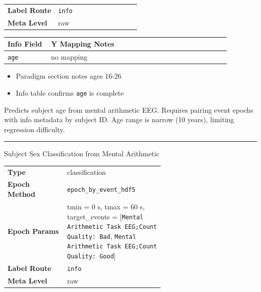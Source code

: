{\begin{tcolorbox}
{\begin{tabular}{@{}lp{0.62\linewidth}@{}}
\textbf{Label Route} & \texttt{info} \\
\textbf{Meta Level} & raw \\
\end{tabular}}
\par{}\par\smallskip
\begingroup\footnotesize
\begin{tabular}{@{}p{0.1760\linewidth}p{0.7040\linewidth}@{}}
\toprule
\textbf{Info Field} & \textbf{Y Mapping Notes} \\
\midrule
\texttt{age} & no mapping \\
\bottomrule
\end{tabular}
\endgroup
\par{}\par
\begin{itemize}[leftmargin=1.3em,noitemsep,topsep=1pt]
\item[\scriptsize$\cdot$] {\scriptsize Paradigm section notes ages 16-26}
\item[\scriptsize$\cdot$] {\scriptsize Info table confirms \texttt{age} is complete}
\end{itemize}
\par{} {\footnotesize Predicts subject age from mental arithmetic EEG. Requires pairing event epochs with info metadata by subject ID. Age range is narrow (10 years), limiting regression difficulty.}
\noindent\rule{\linewidth}{0.4pt}\par\nopagebreak
{} {\footnotesize Subject Sex Classification from Mental Arithmetic}\par\smallskip
{\footnotesize\begin{tabular}{@{}lp{0.62\linewidth}@{}}
\textbf{Type} & classification \\
\textbf{Epoch Method} & \texttt{epoch\_by\_event\_hdf5} \\
\textbf{Epoch Params} & tmin = 0 s, tmax = 60 s, target\_events = [\texttt{Mental Arithmetic Task EEG;Count Quality: Bad}, \texttt{Mental Arithmetic Task EEG;Count Quality: Good}] \\
\textbf{Label Route} & \texttt{info} \\
\textbf{Meta Level} & raw \\
\end{tabular}}
\par{}\par\smallskip

\end{tcolorbox}}
